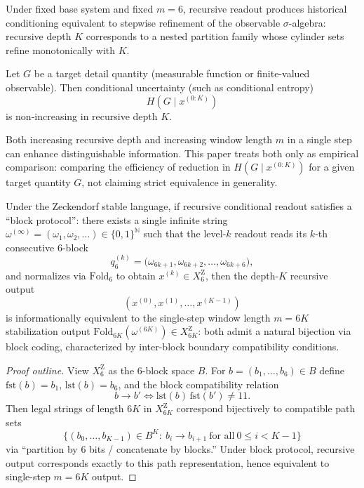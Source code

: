 \begin{proposition}\label{prop:rec-R1}
Under fixed base system and fixed $m=6$, recursive readout produces historical conditioning equivalent to stepwise refinement of the observable $\sigma$-algebra: recursive depth $K$ corresponds to a nested partition family whose cylinder sets refine monotonically with $K$.
\end{proposition}

\begin{proposition}\label{prop:rec-R2}
Let $G$ be a target detail quantity (measurable function or finite-valued observable). Then conditional uncertainty (such as conditional entropy)
$$
H(G\mid x^{(0:K)})
$$
is non-increasing in recursive depth $K$.
\end{proposition}

\begin{proposition}\label{prop:rec-R3}
Both increasing recursive depth and increasing window length $m$ in a single step can enhance distinguishable information. This paper treats both only as empirical comparison: comparing the efficiency of reduction in $H(G\mid x^{(0:K)})$ for a given target quantity $G$, not claiming strict equivalence in generality.
\end{proposition}

\begin{proposition}\label{prop:rec-R4-block-equivalence}
Under the Zeckendorf stable language, if recursive conditional readout satisfies a ``block protocol'': there exists a single infinite string $\omega^{(\infty)}=(\omega_1,\omega_2,\dots)\in\{0,1\}^{\mathbb{N}}$ such that the level-$k$ readout reads its $k$-th consecutive 6-block
\[
q_6^{(k)}=\bigl(\omega_{6k+1},\omega_{6k+2},\dots,\omega_{6k+6}\bigr),
\]
and normalizes via $\mathrm{Fold}_6$ to obtain $x^{(k)}\in X_6^{\mathrm Z}$, then the depth-$K$ recursive output
\[
(x^{(0)},x^{(1)},\dots,x^{(K-1)})
\]
is informationally equivalent to the single-step window length $m=6K$ stabilization output $\mathrm{Fold}_{6K}(\omega^{(6K)})\in X_{6K}^{\mathrm Z}$: both admit a natural bijection via block coding, characterized by inter-block boundary compatibility conditions.
\end{proposition}

\begin{proof}[Proof outline]
View $X_6^{\mathrm Z}$ as the 6-block space $B$. For $b=(b_1,\dots,b_6)\in B$ define $\mathrm{fst}(b)=b_1$, $\mathrm{lst}(b)=b_6$, and the block compatibility relation
\[
b\to b'\iff \mathrm{lst}(b)\,\mathrm{fst}(b')\neq 11.
\]
Then legal strings of length $6K$ in $X_{6K}^{\mathrm Z}$ correspond bijectively to compatible path sets
\[
\{(b_0,\dots,b_{K-1})\in B^K:\ b_i\to b_{i+1}\ \text{for all}\ 0\le i<K-1\}
\]
via ``partition by 6 bits / concatenate by blocks.'' Under block protocol, recursive output corresponds exactly to this path representation, hence equivalent to single-step $m=6K$ output.
\end{proof}


